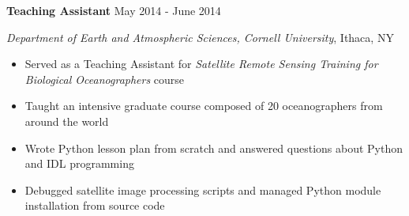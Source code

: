 

\textbf{Teaching Assistant} \hfill May 2014 - June 2014

\textit{Department of Earth and Atmospheric Sciences, Cornell University}, Ithaca, NY

\begin{itemize}
    \item Served as a Teaching Assistant for \textit{Satellite Remote Sensing Training for Biological Oceanographers} course
    \item Taught an intensive graduate course composed of 20 oceanographers from around the world
    \item Wrote Python lesson plan from scratch and answered questions about Python and IDL programming
    \item Debugged satellite image processing scripts and managed Python module installation from source code
\end{itemize}
